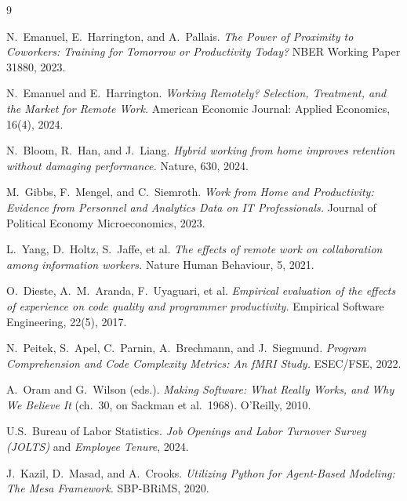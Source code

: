 \documentclass[11pt,a4paper]{article}
\begin{document}
\begin{thebibliography}{9}
\small

 N.~Emanuel, E.~Harrington, and A.~Pallais.
\emph{The Power of Proximity to Coworkers: Training for Tomorrow or Productivity Today?}
NBER Working Paper 31880, 2023.

 N.~Emanuel and E.~Harrington.
\emph{Working Remotely? Selection, Treatment, and the Market for Remote Work.}
American Economic Journal: Applied Economics, 16(4), 2024.

 N.~Bloom, R.~Han, and J.~Liang.
\emph{Hybrid working from home improves retention without damaging performance.}
Nature, 630, 2024.

 M.~Gibbs, F.~Mengel, and C.~Siemroth.
\emph{Work from Home and Productivity: Evidence from Personnel and Analytics Data on IT Professionals.}
Journal of Political Economy Microeconomics, 2023.

 L.~Yang, D.~Holtz, S.~Jaffe, et al.
\emph{The effects of remote work on collaboration among information workers.}
Nature Human Behaviour, 5, 2021.

 O.~Dieste, A.~M.~Aranda, F.~Uyaguari, et al.
\emph{Empirical evaluation of the effects of experience on code quality and programmer productivity.}
Empirical Software Engineering, 22(5), 2017.

 N.~Peitek, S.~Apel, C.~Parnin, A.~Brechmann, and J.~Siegmund.
\emph{Program Comprehension and Code Complexity Metrics: An fMRI Study.}
ESEC/FSE, 2022.

 A.~Oram and G.~Wilson (eds.).
\emph{Making Software: What Really Works, and Why We Believe It} (ch.~30, on Sackman et al.~1968).
O'Reilly, 2010.

 U.S.~Bureau of Labor Statistics.
\emph{Job Openings and Labor Turnover Survey (JOLTS)} and \emph{Employee Tenure}, 2024.

 J.~Kazil, D.~Masad, and A.~Crooks.
\emph{Utilizing Python for Agent-Based Modeling: The Mesa Framework.}
SBP-BRiMS, 2020.

\end{thebibliography}
\end{document}
